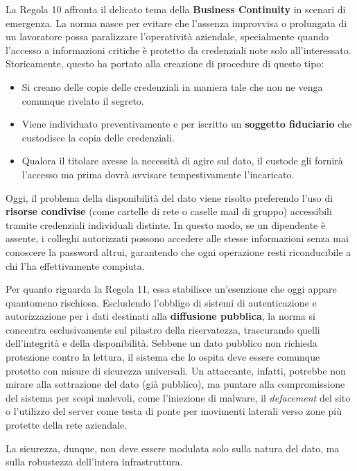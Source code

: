 La Regola 10 affronta il delicato tema della \textbf{Business Continuity} in scenari di emergenza. La norma nasce per evitare che l'assenza improvvisa o prolungata di un lavoratore possa paralizzare l'operatività aziendale, specialmente quando l'accesso a informazioni critiche è protetto da credenziali note solo all'interessato. Storicamente, questo ha portato alla creazione di procedure di questo tipo:
\begin{itemize}
    \item Si creano delle copie delle credenziali in maniera tale che non ne venga comunque rivelato il segreto.
    \item Viene individuato preventivamente e per iscritto un \textbf{soggetto fiduciario} che custodisce la copia delle credenziali.
    \item Qualora il titolare avesse la necessità di agire sul dato, il custode gli fornirà l'accesso ma prima dovrà avvisare tempestivamente l'incaricato.
\end{itemize}

Oggi, il problema della disponibilità del dato viene risolto preferendo l'uso di \textbf{risorse condivise} (come cartelle di rete o caselle mail di gruppo) accessibili tramite credenziali individuali distinte. In questo modo, se un dipendente è assente, i colleghi autorizzati possono accedere alle stesse informazioni senza mai conoscere la password altrui, garantendo che ogni operazione resti riconducibile a chi l'ha effettivamente compiuta.

Per quanto riguarda la Regola 11, essa stabilisce un'esenzione che oggi appare quantomeno rischiosa. Escludendo l'obbligo di sistemi di autenticazione e autorizzazione per i dati destinati alla \textbf{diffusione pubblica}, la norma si concentra esclusivamente sul pilastro della riservatezza, trascurando quelli dell'integrità e della disponibilità. Sebbene un dato pubblico non richieda protezione contro la lettura, il sistema che lo ospita deve essere comunque protetto con misure di sicurezza universali. Un attaccante, infatti, potrebbe non mirare alla sottrazione del dato (già pubblico), ma puntare alla compromissione del sistema per scopi malevoli, come l'iniezione di malware, il \textit{defacement} del sito o l'utilizzo del server come testa di ponte per movimenti laterali verso zone più protette della rete aziendale. 

La sicurezza, dunque, non deve essere modulata solo sulla natura del dato, ma sulla robustezza dell'intera infrastruttura.

